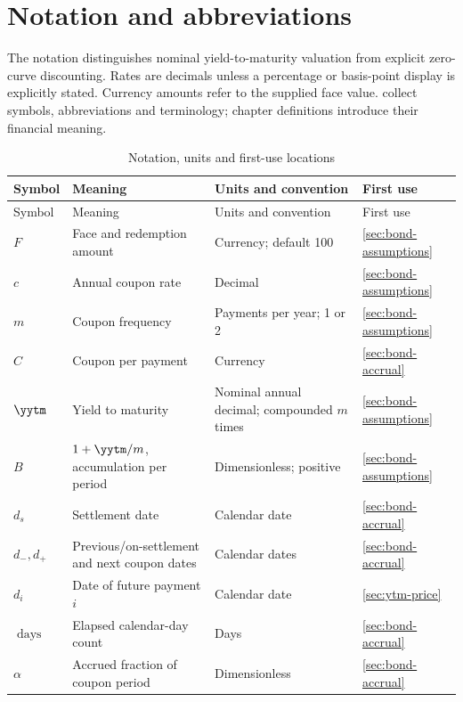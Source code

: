 \chapter*{Notation and abbreviations}
\label{sec:notation}
The notation distinguishes nominal yield-to-maturity valuation from explicit
zero-curve discounting. Rates are decimals unless a percentage or basis-point
display is explicitly stated. Currency amounts refer to the supplied face
value.  collect symbols, abbreviations and terminology; chapter definitions introduce their financial meaning.
\begingroup\small\singlespacing
\setlength{\tabcolsep}{4pt}
\begin{longtable}{@{}L{0.18\textwidth}L{0.36\textwidth}L{0.18\textwidth}L{0.19\textwidth}@{}}
\caption{Notation, units and first-use locations}\label{tab:notation}\\
\toprule
Symbol & Meaning & Units and convention & First use\\
\midrule
\endfirsthead
\toprule Symbol & Meaning & Units and convention & First use\\ \midrule
\endhead
\bottomrule
\endfoot
\(F\) & Face and redemption amount & Currency; default 100 & \ref{sec:bond-assumptions}\\
\(c\) & Annual coupon rate & Decimal & \ref{sec:bond-assumptions}\\
\(m\) & Coupon frequency & Payments per year; 1 or 2 & \ref{sec:bond-assumptions}\\
\(C\) & Coupon per payment & Currency & \ref{sec:bond-accrual}\\
\(\yytm\) & Yield to maturity & Nominal annual decimal; compounded \(m\) times & \ref{sec:bond-assumptions}\\
\(B\) & \(1+\yytm/m\), accumulation per period & Dimensionless; positive & \ref{sec:bond-assumptions}\\
\(d_s\) & Settlement date & Calendar date & \ref{sec:bond-accrual}\\
\(d_-,d_+\) & Previous/on-settlement and next coupon dates & Calendar dates & \ref{sec:bond-accrual}\\
\(d_i\) & Date of future payment \(i\) & Calendar date & \ref{sec:ytm-price}\\
\(\operatorname{days}\) & Elapsed calendar-day count & Days & \ref{sec:bond-accrual}\\
\(\alpha\) & Accrued fraction of coupon period & Dimensionless & \ref{sec:bond-accrual}\\

\end{longtable}
